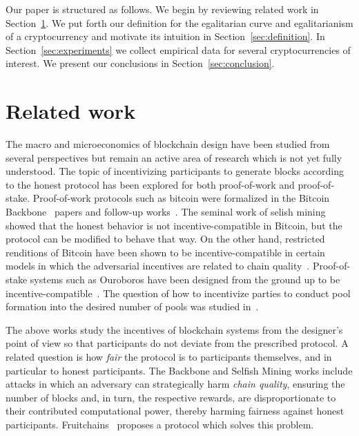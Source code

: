 Our paper is structured as follows. We begin by reviewing related work in
Section~\ref{sec:related}. We put forth our definition for the egalitarian curve
and egalitarianism of a cryptocurrency and motivate its intuition in
Section~\ref{sec:definition}. In Section~\ref{sec:experiments} we collect
empirical data for several cryptocurrencies of interest. We present our
conclusions in Section~\ref{sec:conclusion}.

\section{Related work}\label{sec:related}
The macro and microeconomics of blockchain design have
been studied from several perspectives but remain an active area of research
which is not yet fully understood. The topic of incentivizing participants to
generate blocks according to the honest protocol has been explored for both
proof-of-work and proof-of-stake. Proof-of-work protocols such as bitcoin were
formalized in the Bitcoin Backbone~\cite{backbone1,backbone2} papers and
follow-up works~\cite{pass}. The seminal work of selish mining~\cite{selfish}
showed that the honest behavior is not incentive-compatible in Bitcoin, but the
protocol can be modified to behave that way. On the other hand, restricted
renditions of Bitcoin have been shown to be incentive-compatible in certain
models in which the adversarial incentives are related to chain
quality~\cite{tselekounis-kiayias}. Proof-of-stake systems such as Ouroboros
have been designed from the ground up to be
incentive-compatible~\cite{ouroboros}. The question of how to incentivize
parties to conduct pool formation into the desired number of pools was studied
in~\cite{stouka-koutsoupias-kiayias}.

The above works study the incentives of blockchain systems from the designer's
point of view so that participants do not deviate from the prescribed protocol.
A related question is how \emph{fair} the protocol is to participants
themselves, and in particular to honest participants. The Backbone and Selfish
Mining works include attacks in which an adversary can strategically harm
\emph{chain quality}, ensuring the number of blocks and, in turn, the respective
rewards, are disproportionate to their contributed computational power, thereby
harming fairness against honest participants. Fruitchains~\cite{fruitchains}
proposes a protocol which solves this problem.

